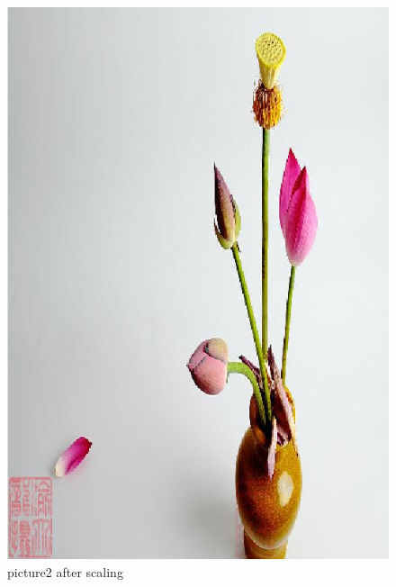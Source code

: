 \documentclass[final]{cvpr}
\begin{document}
\begin{figure}
\begin{center}
    \includegraphics[scale=0.15]{pics/1-2.png}
    \caption{picture2 after scaling}
    \label{pic1-2}

\end{center}
\end{figure}
\end{document}
